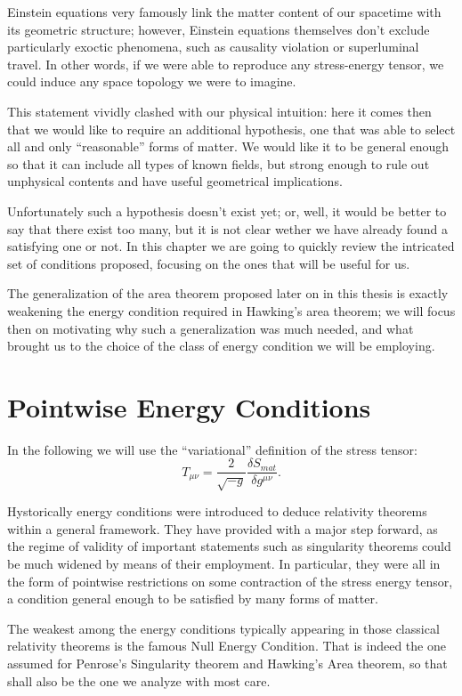 Einstein equations very famously link the matter content of our spacetime with its geometric structure; however, Einstein equations themselves don't exclude particularly exoctic phenomena, such as causality violation or superluminal travel. In other words, if we were able to reproduce any stress-energy tensor, we could induce any space topology we were to imagine.

This statement vividly clashed with our physical intuition: here it comes then that we would like to require an additional hypothesis, one that was able to select all and only ``reasonable'' forms of matter. We would like it to be general enough so that it can include all types of known fields, but strong enough to rule out unphysical contents and have useful geometrical implications.

Unfortunately such a hypothesis doesn't exist yet; or, well, it would be better to say that there exist too many, but it is not clear wether we have already found a satisfying one or not. In this chapter we are going to quickly review the intricated set of conditions proposed, focusing on the ones that will be useful for us. 

The generalization of the area theorem proposed later on in this thesis is exactly weakening the energy condition required in Hawking's area theorem; we will focus then on motivating why such a generalization was much needed, and what brought us to the choice of the class of energy condition we will be employing.

\section{Pointwise Energy Conditions}
\label{sec:pointwise-energy-conditions}

In the following we will use the ``variational'' definition of the stress tensor:
\[
   T_{\mu\nu} = \frac{2}{\sqrt{-g}} \frac{\delta S_{mat}}{\delta g^{\mu\nu}}. 
\]

Hystorically energy conditions were introduced to deduce relativity theorems within a general framework. They have provided with a major step forward, as the regime of validity of important statements such as singularity theorems could be much widened by means of their employment. 
In particular, they were all in the form of pointwise restrictions on some contraction of the stress energy tensor, a condition general enough to be satisfied by many forms of matter.

The weakest among the energy conditions typically appearing in those classical relativity theorems is the famous Null Energy Condition. That is indeed the one assumed for Penrose's Singularity theorem and Hawking's Area theorem, so that shall also be the one we analyze with most care.

